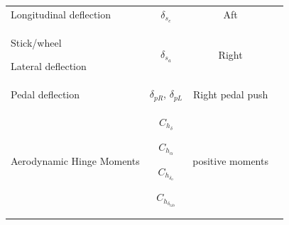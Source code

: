 \documentclass[
]{book}
\begin{document}
\begin{longtable}[]{@{}lccc@{}}
\begin{minipage}[t]{0.38\columnwidth}
Longitudinal deflection\strut
\end{minipage} & \begin{minipage}[t]{0.20\columnwidth}\centering
\(\delta_{s_e}\)\strut
\end{minipage} & \begin{minipage}[t]{0.15\columnwidth}\centering
Aft\strut
\end{minipage} & \begin{minipage}[t]{0.15\columnwidth}\centering
\strut
\end{minipage}\tabularnewline
\begin{minipage}[t]{0.38\columnwidth}\raggedright
Stick/wheel

Lateral deflection\strut
\end{minipage} & \begin{minipage}[t]{0.20\columnwidth}\centering
\(\delta_{s_a}\)\strut
\end{minipage} & \begin{minipage}[t]{0.15\columnwidth}\centering
Right\strut
\end{minipage} & \begin{minipage}[t]{0.15\columnwidth}\centering
\strut
\end{minipage}\tabularnewline
\begin{minipage}[t]{0.38\columnwidth}\raggedright
Pedal deflection\strut
\end{minipage} & \begin{minipage}[t]{0.20\columnwidth}\centering
\(\delta_{pR}\),
\(\delta_{pL}\)\strut
\end{minipage} & \begin{minipage}[t]{0.15\columnwidth}\centering
Right pedal push\strut
\end{minipage} & \begin{minipage}[t]{0.15\columnwidth}\centering
\strut
\end{minipage}\tabularnewline
\begin{minipage}[t]{0.38\columnwidth}\raggedright
Aerodynamic Hinge Moments\strut
\end{minipage} & \begin{minipage}[t]{0.20\columnwidth}\centering
\(C_{h_\delta}\)

\(C_{h_\alpha}\)

\(C_{h_{\delta_o}}\)

\(C_{h_{\delta_\text{tab}}}\)\strut
\end{minipage} & \begin{minipage}[t]{0.15\columnwidth}\centering
positive moments


\end{minipage}
\end{longtable}
\end{document}

